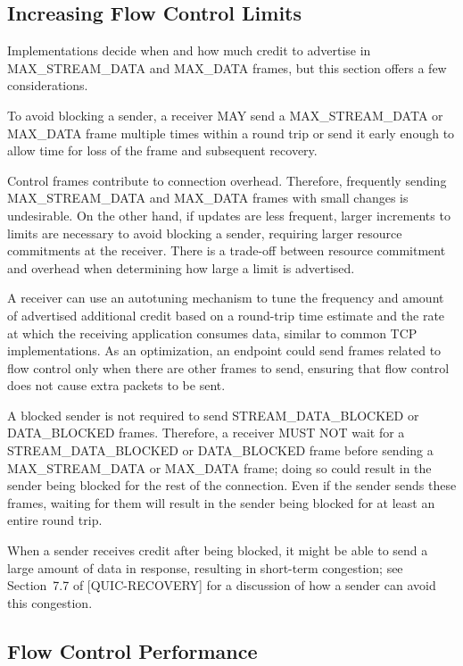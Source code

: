 \documentclass{article}
\begin{document}
\subsection{Increasing Flow Control Limits}

Implementations decide when and how much credit to advertise in MAX\_STREAM\_DATA and MAX\_DATA frames, but this section offers a few considerations.

To avoid blocking a sender, a receiver MAY send a MAX\_STREAM\_DATA or MAX\_DATA frame multiple times within a round trip or send it early enough to allow time for loss of the frame and subsequent recovery.

Control frames contribute to connection overhead.  Therefore, frequently sending MAX\_STREAM\_DATA and MAX\_DATA frames with small changes is undesirable.  On the other hand, if updates are less frequent, larger increments to limits are necessary to avoid blocking a sender, requiring larger resource commitments at the receiver. There is a trade-off between resource commitment and overhead when determining how large a limit is advertised.

A receiver can use an autotuning mechanism to tune the frequency and amount of advertised additional credit based on a round-trip time estimate and the rate at which the receiving application consumes data, similar to common TCP implementations.  As an optimization, an endpoint could send frames related to flow control only when there are other frames to send, ensuring that flow control does not cause extra packets to be sent.

A blocked sender is not required to send STREAM\_DATA\_BLOCKED or DATA\_BLOCKED frames.  Therefore, a receiver MUST NOT wait for a STREAM\_DATA\_BLOCKED or DATA\_BLOCKED frame before sending a MAX\_STREAM\_DATA or MAX\_DATA frame; doing so could result in the sender being blocked for the rest of the connection.  Even if the sender sends these frames, waiting for them will result in the sender being blocked for at least an entire round trip.

When a sender receives credit after being blocked, it might be able to send a large amount of data in response, resulting in short-term congestion; see Section~7.7 of [QUIC-RECOVERY] for a discussion of how a sender can avoid this congestion.

\subsection{Flow Control Performance}
\end{document}
